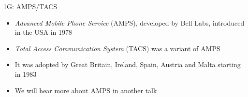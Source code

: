 \begin{frame}{1G: AMPS/TACS}
  \begin{itemize}  
    \item \emph{Advanced Mobile Phone Service} (AMPS), developed by Bell Labs, introduced in the USA in 1978
    \item \emph{Total Access Communication System} (TACS) was a variant of AMPS
    \item It was adopted by Great Britain, Ireland, Spain, Austria and Malta starting in 1983
    \item We will hear more about AMPS in another talk
  \end{itemize}
\end{frame}
